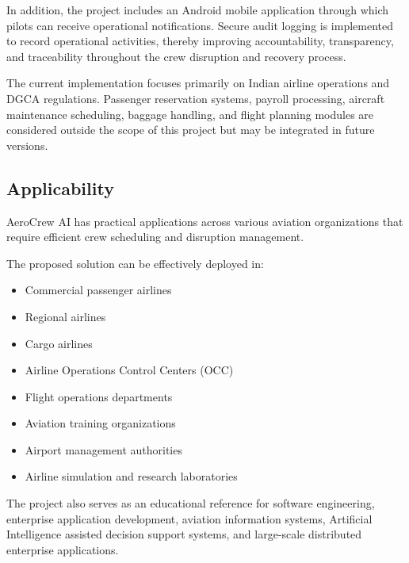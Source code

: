\documentclass[12pt,a4paper]{report}
\begin{document}
In addition, the project includes an Android mobile application through which pilots can receive operational notifications. Secure audit logging is implemented to record operational activities, thereby improving accountability, transparency, and traceability throughout the crew disruption and recovery process.

The current implementation focuses primarily on Indian airline operations and DGCA regulations. Passenger reservation systems, payroll processing, aircraft maintenance scheduling, baggage handling, and flight planning modules are considered outside the scope of this project but may be integrated in future versions.

\subsection{Applicability}

AeroCrew AI has practical applications across various aviation organizations that require efficient crew scheduling and disruption management.

The proposed solution can be effectively deployed in:

\begin{itemize}[leftmargin=*]

\item Commercial passenger airlines

\item Regional airlines

\item Cargo airlines

\item Airline Operations Control Centers (OCC)

\item Flight operations departments

\item Aviation training organizations

\item Airport management authorities

\item Airline simulation and research laboratories

\end{itemize}

The project also serves as an educational reference for software engineering, enterprise application development, aviation information systems, Artificial Intelligence assisted decision support systems, and large-scale distributed enterprise applications.
\end{document}
